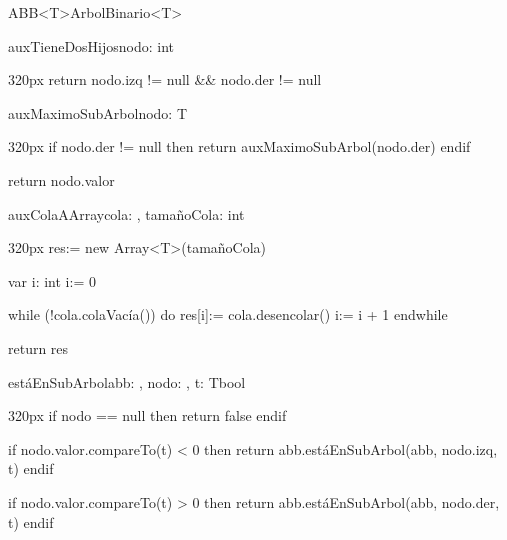 \documentclass[10pt,a4paper]{article}
\begin{document}
\vspace{1em}
\begin{ModuloImplements}{ABB<T>}{ArbolBinario<T>}
  \begin{Vars}
  \end{Vars}
  \begin{proc}{auxTieneDosHijos}{\In nodo: }{int}
    \begin{ImplementationCode}{320px}
      return nodo.izq != null && nodo.der != null
    \end{ImplementationCode}
  \end{proc}
  \begin{proc}{auxMaximoSubArbol}{\In nodo: }{T}
    \begin{ImplementationCode}{320px}
      if nodo.der != null then
        return auxMaximoSubArbol(nodo.der)
      endif

      return nodo.valor
    \end{ImplementationCode}
  \end{proc}
  \begin{proc}{auxColaAArray}{\In cola: , \In tamañoCola: int}{}
    \begin{ImplementationCode}{320px}
      res:= new Array<T>(tamañoCola)
      
      var i: int
          i:= 0

      while (!cola.colaVacía()) do
        res[i]:= cola.desencolar()
        i:= i + 1
      endwhile

      return res
    \end{ImplementationCode}
  \end{proc}
  \begin{proc}{estáEnSubArbol}{\In abb: , \In nodo: , \In t: T}{bool}
    \begin{ImplementationCode}{320px}
      if nodo == null then
        return false
      endif

      if nodo.valor.compareTo(t) < 0 then
        return abb.estáEnSubArbol(abb, nodo.izq, t)
      endif

      if nodo.valor.compareTo(t) > 0 then
        return abb.estáEnSubArbol(abb, nodo.der, t)
      endif


\end{ImplementationCode}
\end{proc}
\end{ModuloImplements}
\end{document}
